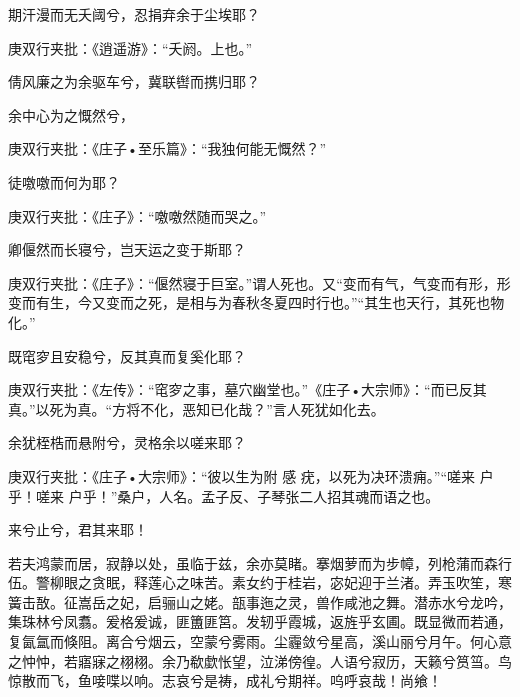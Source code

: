 \begin{qute2sp}
\begin{poem}
        \begin{pl}期汗漫而无夭阈兮，忍捐弃余于尘埃耶？\end{pl}
        \begin{note}庚双行夹批：《逍遥游》：“夭阏。上也。”\end{note}

        \begin{pl}倩风廉之为余驱车兮，冀联辔而携归耶？\end{pl}

        \begin{pl}余中心为之慨然兮，\end{pl}
        \begin{note}庚双行夹批：《庄子•至乐篇》：“我独何能无慨然？”\end{note}徒噭噭而何为耶？
        \begin{note}庚双行夹批：《庄子》：“噭噭然随而哭之。”\end{note}

        \begin{pl}卿偃然而长寝兮，岂天运之变于斯耶？\end{pl}
        \begin{note}庚双行夹批：《庄子》：“偃然寝于巨室。”谓人死也。又“变而有气，气变而有形，形变而有生，今又变而之死，是相与为春秋冬夏四时行也。”“其生也天行，其死也物化。”\end{note}

        \begin{pl}既窀穸且安稳兮，反其真而复奚化耶？\end{pl}
        \begin{note}庚双行夹批：《左传》：“窀穸之事，墓穴幽堂也。”《庄子•大宗师》：“而已反其真。”以死为真。“方将不化，恶知已化哉？”言人死犹如化去。\end{note}

        \begin{pl}余犹桎梏而悬附兮，灵格余以嗟来耶？\end{pl}
        \begin{note}庚双行夹批：《庄子•大宗师》：“彼以生为附 感 疣，以死为决环溃痈。”“嗟来 户乎！嗟来 户乎！”桑户，人名。孟子反、子琴张二人招其魂而语之也。\end{note}

        \begin{pl}来兮止兮，君其来耶！\end{pl}
    \end{poem}

    \begin{parag}
        若夫鸿蒙而居，寂静以处，虽临于兹，余亦莫睹。搴烟萝而为步幛，列枪蒲而森行伍。警柳眼之贪眠，释莲心之味苦。素女约于桂岩，宓妃迎于兰渚。弄玉吹笙，寒簧击敔。征嵩岳之妃，启骊山之姥。瓿事迤之灵，兽作咸池之舞。潜赤水兮龙吟，集珠林兮凤翥。爰格爰诚，匪簠匪筥。发轫乎霞城，返旌乎玄圃。既显微而若通，复氤氲而倏阻。离合兮烟云，空蒙兮雾雨。尘霾敛兮星高，溪山丽兮月午。何心意之忡忡，若寤寐之栩栩。余乃欷歔怅望，泣涕傍徨。人语兮寂历，天籁兮筼筜。鸟惊散而飞，鱼唼喋以响。志哀兮是祷，成礼兮期祥。呜呼哀哉！尚飨！
    \end{parag}

\end{qute2sp}

